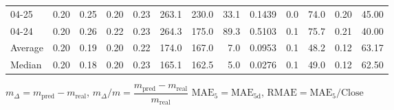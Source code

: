 \begin{threeparttable}
{\begin{tabular}{lrrrrrrrrrrrr}
  04-25 &          0.20 &          0.25 &          0.20 &        0.23 &               263.1 &               230.0 &       33.1 &       0.1439 &                 0.0 &             74.0 &            0.20 &                  45.00 \\
  04-24 &          0.20 &          0.26 &          0.22 &        0.23 &               264.3 &               175.0 &       89.3 &       0.5103 &                 0.1 &             75.7 &            0.21 &                  40.00 \\
Average &          0.20 &          0.19 &          0.20 &        0.22 &               174.0 &               167.0 &        7.0 &       0.0953 &                 0.1 &             48.2 &            0.12 &                  63.17 \\
 Median &          0.20 &          0.18 &          0.20 &        0.23 &               165.1 &               162.5 &        5.0 &       0.0276 &                 0.1 &             49.0 &            0.12 &                  62.50 \\
\bottomrule
\end{tabular}
}
\begin{tablenotes}\footnotesize
\item $m_\Delta=m_{\text{pred}}-m_{\text{real}}$,
$m_\Delta/m=\dfrac{m_{\text{pred}}-m_{\text{real}}}{m_{\text{real}}}$
$\mathrm{MAE}_5=\mathrm{MAE}_{5\text{d}}$,
$\mathrm{RMAE}=\mathrm{MAE}_5/\text{Close}$
\end{tablenotes}
\end{threeparttable}
\endgroup

